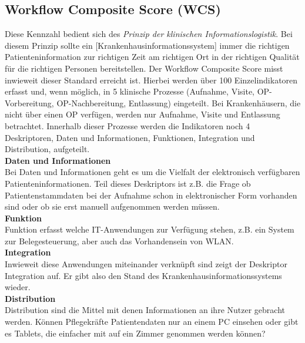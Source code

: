 \subsection{Workflow Composite Score (WCS)}
	Diese Kennzahl bedient sich des \textit{Prinzip der klinischen Informationslogistik}. Bei diesem Prinzip \glqq{}sollte ein [Krankenhausinformationssystem] immer die richtigen Patienteninformation zur richtigen Zeit am richtigen Ort in der richtigen Qualität für die richtigen Personen bereitstellen.\grqq\parencite[36]{huebner2019} Der Workflow Composite Score misst inwieweit dieser Standard erreicht ist. Hierbei werden über 100 Einzelindikatoren erfasst und, wenn möglich, in 5 klinische Prozesse (Aufnahme, Visite, OP-Vorbereitung, OP-Nachbereitung, Entlassung) eingeteilt. Bei Krankenhäusern, die nicht über einen OP verfügen, werden nur Aufnahme, Visite und Entlassung betrachtet. Innerhalb dieser Prozesse werden die Indikatoren noch 4 Deskriptoren, Daten und Informationen, Funktionen, Integration und Distribution, aufgeteilt. \parencite{huebner2019}
	\vspace{\parheadvspace}\\
	\textbf{Daten und Informationen}\\
	Bei Daten und Informationen geht es um die Vielfalt der elektronisch verfügbaren Patienteninformationen. Teil dieses Deskriptors ist z.B. die Frage ob Patientenstammdaten bei der Aufnahme schon in elektronischer Form vorhanden sind oder ob sie erst manuell aufgenommen werden müssen. 
	\vspace{\parheadvspace}\\
	\textbf{Funktion}\\
	Funktion erfasst welche IT-Anwendungen zur Verfügung stehen, z.B. ein System zur Belegesteuerung, aber auch das Vorhandensein von WLAN.
	\vspace{\parheadvspace}\\
	\textbf{Integration}\\
	Inwieweit diese Anwendungen miteinander verknüpft sind zeigt der Deskriptor Integration auf. Er gibt also den Stand des Krankenhausinformationssystems wieder.
	\vspace{\parheadvspace}\\
	\textbf{Distribution}\\
	Distribution sind die Mittel mit denen Informationen an ihre Nutzer gebracht werden. Können Pflegekräfte Patientendaten nur an einem PC einsehen oder gibt es Tablets, die einfacher mit auf ein Zimmer genommen werden können?

